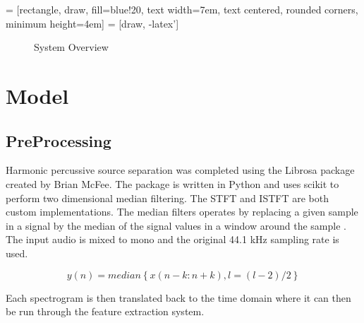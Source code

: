\documentclass{article}
\begin{document}
 = [rectangle, draw, fill=blue!20,
    text width=7em, text centered, rounded corners, minimum height=4em]
 = [draw, -latex']

\begin{figure}
\caption{System Overview}
\label{fig:overview}
\end{figure}

\section{Model}

\subsection{PreProcessing}
Harmonic percussive source separation was completed using the Librosa package created by Brian McFee.
The package is written in Python and uses scikit to perform two dimensional median filtering. The
STFT and ISTFT are both custom implementations. The median filters operates by replacing a given sample
in a signal by the median of the signal values in a window around the sample \cite{FitzGerald:11}. The input
audio is mixed to mono and the original 44.1 kHz sampling rate is used. 

$$y(n) = median \left \{x(n-k:n+k),l = (l-2)/2  \right \}$$

Each spectrogram is then translated back to the time domain where it can then be run through the
feature extraction system.
\end{document}
